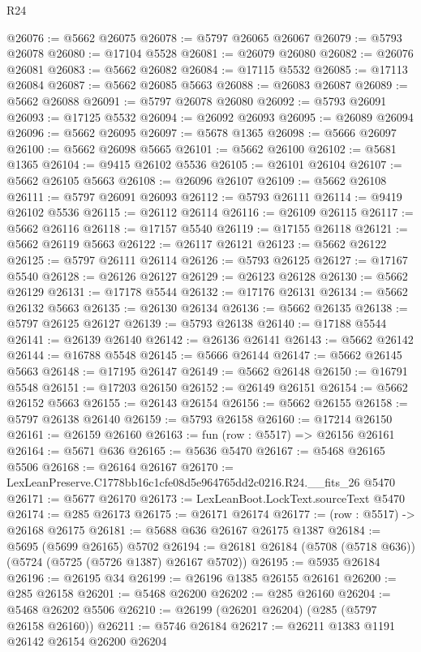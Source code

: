 \begin{lexlean}{R24}
\begin{coremodule}
@26076 := @5662 @26075
@26078 := @5797 @26065 @26067
@26079 := @5793 @26078
@26080 := @17104 @5528
@26081 := @26079 @26080
@26082 := @26076 @26081
@26083 := @5662 @26082
@26084 := @17115 @5532
@26085 := @17113 @26084
@26087 := @5662 @26085 @5663
@26088 := @26083 @26087
@26089 := @5662 @26088
@26091 := @5797 @26078 @26080
@26092 := @5793 @26091
@26093 := @17125 @5532
@26094 := @26092 @26093
@26095 := @26089 @26094
@26096 := @5662 @26095
@26097 := @5678 @1365
@26098 := @5666 @26097
@26100 := @5662 @26098 @5665
@26101 := @5662 @26100
@26102 := @5681 @1365
@26104 := @9415 @26102 @5536
@26105 := @26101 @26104
@26107 := @5662 @26105 @5663
@26108 := @26096 @26107
@26109 := @5662 @26108
@26111 := @5797 @26091 @26093
@26112 := @5793 @26111
@26114 := @9419 @26102 @5536
@26115 := @26112 @26114
@26116 := @26109 @26115
@26117 := @5662 @26116
@26118 := @17157 @5540
@26119 := @17155 @26118
@26121 := @5662 @26119 @5663
@26122 := @26117 @26121
@26123 := @5662 @26122
@26125 := @5797 @26111 @26114
@26126 := @5793 @26125
@26127 := @17167 @5540
@26128 := @26126 @26127
@26129 := @26123 @26128
@26130 := @5662 @26129
@26131 := @17178 @5544
@26132 := @17176 @26131
@26134 := @5662 @26132 @5663
@26135 := @26130 @26134
@26136 := @5662 @26135
@26138 := @5797 @26125 @26127
@26139 := @5793 @26138
@26140 := @17188 @5544
@26141 := @26139 @26140
@26142 := @26136 @26141
@26143 := @5662 @26142
@26144 := @16788 @5548
@26145 := @5666 @26144
@26147 := @5662 @26145 @5663
@26148 := @17195 @26147
@26149 := @5662 @26148
@26150 := @16791 @5548
@26151 := @17203 @26150
@26152 := @26149 @26151
@26154 := @5662 @26152 @5663
@26155 := @26143 @26154
@26156 := @5662 @26155
@26158 := @5797 @26138 @26140
@26159 := @5793 @26158
@26160 := @17214 @26150
@26161 := @26159 @26160
@26163 := fun (row : @5517) => @26156 @26161
@26164 := @5671 @636
@26165 := @5636 @5470
@26167 := @5468 @26165 @5506
@26168 := @26164 @26167
@26170 := LexLeanPreserve.C1778bb16c1cfe08d5e964765dd2c0216.R24.__fits_26 @5470
@26171 := @5677 @26170
@26173 := LexLeanBoot.LockText.sourceText @5470
@26174 := @285 @26173
@26175 := @26171 @26174
@26177 := (row : @5517) -> @26168 @26175
@26181 := @5688 @636 @26167 @26175 @1387
@26184 := @5695 (@5699 @26165) @5702
@26194 := @26181 @26184 (@5708 (@5718 @636)) (@5724 (@5725 (@5726 @1387) @26167 @5702))
@26195 := @5935 @26184
@26196 := @26195 @34
@26199 := @26196 @1385 @26155 @26161
@26200 := @285 @26158
@26201 := @5468 @26200
@26202 := @285 @26160
@26204 := @5468 @26202 @5506
@26210 := @26199 (@26201 @26204) (@285 (@5797 @26158 @26160))
@26211 := @5746 @26184
@26217 := @26211 @1383 @1191 @26142 @26154 @26200 @26204

\end{coremodule}
\end{lexlean}
